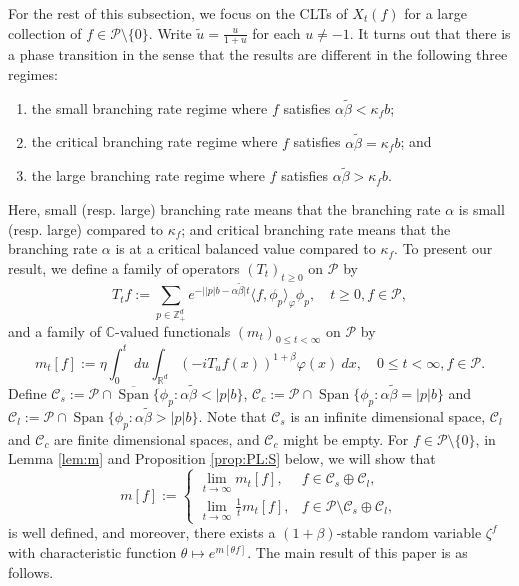 \documentclass[EJP]{ejpecp} %
\begin{document}
	For the rest of this subsection, we focus on the CLTs of $X_t(f)$ for a large collection of $f\in \mathcal P\setminus \{0\}$.
	Write $\tilde u = \frac{u}{ 1+ u}$ for each $u \neq -1$.
	It turns out that there is a phase transition in the sense that the results are different in the following three
	regimes:
\begin{enumerate}
\item
	the small branching rate regime
	where $f$ satisfies $\alpha \tilde \beta < \kappa_f b$;
\item
  	the critical branching rate regime
  	where $f$ satisfies $\alpha \tilde \beta = \kappa_f b$; and
\item
	the large branching rate regime
	where $f$ satisfies $\alpha \tilde \beta > \kappa_f b$.
\end{enumerate}
	Here, small (resp. large) branching rate
	means that the branching rate $\alpha$ is small (resp. large) compared to $\kappa_f$;
    and critical branching rate means that the branching rate $\alpha$ is
	at a critical balanced value compared to $\kappa_f$.
	To present our result, we define a family of operators $(T_t)_{t\geq 0}$ on $\mathcal P$ by
\begin{equation}
\label{eq:I:R:1}
	T_t f
  	:= \sum_{p \in \mathbb Z_+^d} e^{-\big| |p|b - \alpha \tilde \beta \big|t} \langle f, \phi_p \rangle_{\varphi} \phi_p
	,\quad t\geq 0, f\in \mathcal P,
\end{equation}
	and a family of $\mathbb C$-valued functionals $(m_t)_{0 \leq t < \infty}$ on $\mathcal P$ by
\begin{equation}
\label{eq:I:R:2}
  	m_t[f]
  	:= \eta \int_0^t ~du \int_{\mathbb R^d} (-iT_u f(x))^{1+\beta} \varphi(x) ~dx,
  	\quad 0 \leq t< \infty, f\in \mathcal P.
\end{equation}
	Define $ \mathcal C_s := \mathcal P \cap \overline{\operatorname{Span}} \{ \phi_p: \alpha \tilde \beta < |p| b \}$, $\mathcal C_c   := \mathcal P \cap \operatorname{Span} \{ \phi_p : \alpha \tilde \beta = |p| b \}$ and $ \mathcal C_l   := \mathcal P \cap \operatorname{Span} \{ \phi_p: \alpha \tilde \beta > |p| b \}$.
	Note that $\mathcal C_s$ is an infinite dimensional space, $ \mathcal C_l$ and $\mathcal C_c$ are finite dimensional spaces, and $\mathcal C_c$ might be empty.
	For $f\in \mathcal P\setminus \{0\}$, in Lemma \ref{lem:m} and Proposition \ref{prop:PL:S} below, we will show that
\begin{equation}
\label{eq:I:R:3}
	m[f]
	:=
\begin{cases}
    \lim_{t\to \infty} m_t[f], &
    f \in \mathcal C_s \oplus \mathcal C_l, \\
    \lim_{t\to \infty} \frac{1}{t} m_t[f], & f\in \mathcal P \setminus \mathcal C_s \oplus \mathcal C_l,
\end{cases}
\end{equation}
	is well defined, and moreover, there exists a $(1+\beta)$-stable random variable $\zeta^f$ with characteristic function $\theta \mapsto e^{m[\theta f]}$.
	The main result of this paper is as follows.
\end{document}
